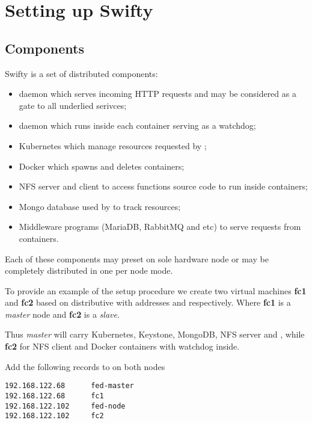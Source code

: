 \chapter{Setting up Swifty}
\label{ch:setup}

\section{Components}
\label{sec:setup-components}

Swifty is a set of distributed components:

\begin{itemize}
\item{ daemon which serves incoming HTTP requests and may
	be considered as a gate to all underlied serivces;}
\item{ daemon which runs inside each container serving as a watchdog;}
\item{Kubernetes which manage resources requested by ;}
\item{Docker which spawns and deletes containers;}
\item{NFS server and client to access functions source code
	to run inside containers;}
\item{Mongo database used by  to track resources;}
\item{Middleware programs (MariaDB, RabbitMQ and etc) to serve requests from
	containers.}
\end{itemize}

Each of these components may preset on sole hardware node or may be
completely distributed in one per node mode.

To provide an example of the setup procedure we create two virtual machines
\textbf{fc1} and \textbf{fc2} based on
 distributive
with addresses  and  respectively.
Where \textbf{fc1} is a \emph{master} node and \textbf{fc2} is a \emph{slave}.

Thus \emph{master} will carry Kubernetes, Keystone, MongoDB, NFS server
and , while \textbf{fc2} for NFS client and Docker containers
with  watchdog inside.

Add the following records to  on both nodes

\begin{lstlisting}
192.168.122.68		fed-master
192.168.122.68		fc1
192.168.122.102		fed-node
192.168.122.102		fc2
\end{lstlisting}


